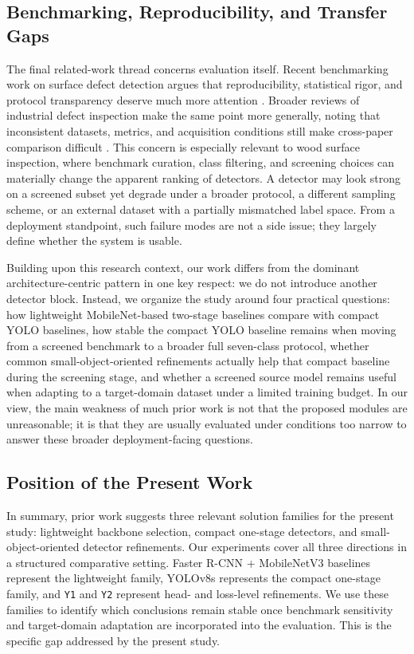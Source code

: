 \subsection{Benchmarking, Reproducibility, and Transfer Gaps}

The final related-work thread concerns evaluation itself. Recent benchmarking work on surface defect detection argues that reproducibility, statistical rigor, and protocol transparency deserve much more attention \citep{defect_benchmark_rigorous}. Broader reviews of industrial defect inspection make the same point more generally, noting that inconsistent datasets, metrics, and acquisition conditions still make cross-paper comparison difficult \citep{ma_2024_air,wang_2025_ieeeaccess}. This concern is especially relevant to wood surface inspection, where benchmark curation, class filtering, and screening choices can materially change the apparent ranking of detectors. A detector may look strong on a screened subset yet degrade under a broader protocol, a different sampling scheme, or an external dataset with a partially mismatched label space. From a deployment standpoint, such failure modes are not a side issue; they largely define whether the system is usable.

Building upon this research context, our work differs from the dominant architecture-centric pattern in one key respect: we do not introduce another detector block. Instead, we organize the study around four practical questions: how lightweight MobileNet-based two-stage baselines compare with compact YOLO baselines, how stable the compact YOLO baseline remains when moving from a screened benchmark to a broader full seven-class protocol, whether common small-object-oriented refinements actually help that compact baseline during the screening stage, and whether a screened source model remains useful when adapting to a target-domain dataset under a limited training budget. In our view, the main weakness of much prior work is not that the proposed modules are unreasonable; it is that they are usually evaluated under conditions too narrow to answer these broader deployment-facing questions.

\subsection{Position of the Present Work}

In summary, prior work suggests three relevant solution families for the present study: lightweight backbone selection, compact one-stage detectors, and small-object-oriented detector refinements. Our experiments cover all three directions in a structured comparative setting. Faster R-CNN + MobileNetV3 baselines represent the lightweight family, YOLOv8s represents the compact one-stage family, and \texttt{Y1} and \texttt{Y2} represent head- and loss-level refinements. We use these families to identify which conclusions remain stable once benchmark sensitivity and target-domain adaptation are incorporated into the evaluation. This is the specific gap addressed by the present study.
